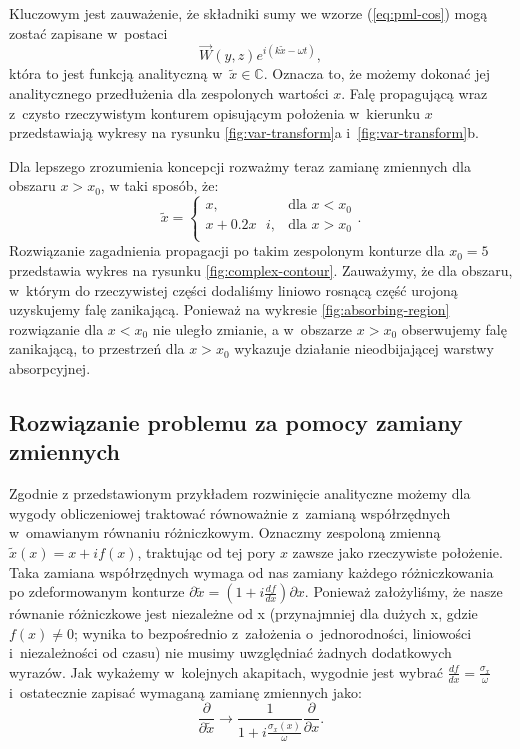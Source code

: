 Kluczowym jest zauważenie, że składniki sumy we wzorze (\ref{eq:pml-cos}) mogą zostać zapisane w~postaci
\begin{equation}
\vec{W}(y,z)e^{i(k\tilde{x}-\omega t)},
\end{equation}
która to jest funkcją analityczną w~$\tilde{x}\in \mathbb{C}$. Oznacza to, że możemy dokonać jej analitycznego przedłużenia dla zespolonych wartości $x$. Falę propagującą wraz z~czysto rzeczywistym konturem opisującym położenia w~kierunku $x$ przedstawiają wykresy na rysunku \ref{fig:var-transform}a i~\ref{fig:var-transform}b. 

Dla lepszego zrozumienia koncepcji rozważmy teraz zamianę zmiennych dla obszaru $x>x_0$, w taki sposób, że: 
\begin{equation}
\tilde{x}=  
\begin{cases} 
        x, & \mbox{dla } x< x_0 \\ 
        x+0.2x\mbox{ }i, & \mbox{dla } x>x_0 \\
\end{cases}.
\end{equation}
Rozwiązanie zagadnienia propagacji po takim zespolonym konturze dla $x_0=5$ przedstawia wykres na rysunku \ref{fig:complex-contour}. Zauważymy, że dla obszaru, w~którym do rzeczywistej części dodaliśmy liniowo rosnącą część urojoną uzyskujemy falę zanikającą. Ponieważ na wykresie \ref{fig:absorbing-region} rozwiązanie dla $x<x_0$ nie uległo zmianie, a w~obszarze $x>x_0$ obserwujemy falę zanikającą, to przestrzeń dla $x>x_0$ wykazuje działanie nieodbijającej warstwy absorpcyjnej.

\subsection{Rozwiązanie problemu za pomocy zamiany zmiennych}

Zgodnie z przedstawionym przykładem rozwinięcie analityczne możemy dla wygody obliczeniowej traktować równoważnie z~zamianą współrzędnych w~omawianym równaniu różniczkowym. Oznaczmy zespoloną zmienną $\tilde{x}(x)=x+if(x)$, traktując od tej pory $x$ zawsze jako rzeczywiste położenie. Taka zamiana współrzędnych wymaga od nas zamiany każdego różniczkowania po zdeformowanym konturze $\partial \tilde{x} = (1+i\frac{df}{dx}) \partial x$. Ponieważ założyliśmy, że nasze równanie różniczkowe jest niezależne od x (przynajmniej dla dużych x, gdzie $f(x)\ne0$; wynika to bezpośrednio z~założenia o~jednorodności, liniowości i~niezależności od czasu) nie musimy uwzględniać żadnych dodatkowych wyrazów. Jak wykażemy w~kolejnych akapitach, wygodnie jest wybrać $\frac{df}{dx}=\frac{\sigma_x}{\omega}$ i~ostatecznie zapisać wymaganą zamianę zmiennych jako:
\begin{equation}
	\frac{\partial}{\partial \tilde{x}} \to \frac{1} {1+i \frac{\sigma_x(x)}{\omega}} \frac{\partial}{\partial x}.
	\label{eq:pml-variable-change}
\end{equation}

